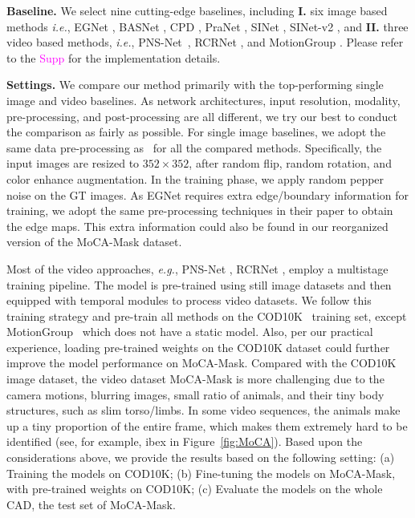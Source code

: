 \documentclass[10pt,twocolumn,letterpaper]{article}
\def\eg{\emph{e.g.}}
\def\ie{\emph{i.e.}}
\newcommand{\supp}[1]{\textcolor{magenta}{#1}}
\def\figref#1{Figure~\ref{#1}}
\begin{document}
\textbf{Baseline.}
We select nine cutting-edge baselines, including \textbf{I.} six image based methods \ie, EGNet \cite{zhao2019EGNet}, BASNet \cite{Qin_2019_CVPR} ,   {CPD} \cite{Wu_2019_CVPR}, {PraNet} \cite{fan2020pra}, {SINet} \cite{fan2020Camouflage}, {SINet-v2} \cite{fan2021concealed}, and \textbf{II.}  three video based methods, \ie, PNS-Net~\cite{ji2021progressively}, {RCRNet} \cite{yan2019semi}, and {MotionGroup} \cite{yang2021selfsupervised}. Please refer to the \supp{Supp} for the implementation details.

\textbf{Settings.}
We compare our method primarily with the top-performing single image and video baselines. As network architectures, input resolution, modality, pre-processing, and post-processing are all different, we try our best to conduct the comparison as fairly as possible. For single image baselines, we adopt the same data pre-processing as~\cite{fan2020Camouflage, fan2021concealed} for all the compared methods. Specifically, the input images are resized to $352 \times 352$, after random flip, random rotation, and color enhance augmentation. In the training phase, we apply random pepper noise on the GT images.
As EGNet \cite{zhao2019EGNet} requires extra edge/boundary information for training, we adopt the same pre-processing techniques in their paper to obtain the edge maps. This extra information could also be found in our reorganized version of the MoCA-Mask dataset. 


Most of the video approaches, \eg, PNS-Net \cite{ji2021progressively}, RCRNet \cite{yan2019semi}, employ a multistage training pipeline. The model is pre-trained using still image datasets and then equipped with temporal modules to process video datasets. We follow this training strategy and pre-train all methods on the COD10K~\cite{fan2021concealed} training set, except MotionGroup~\cite{yang2021selfsupervised} which does not have a static model. Also, per our practical experience, loading pre-trained weights on the COD10K dataset could further improve the model performance on MoCA-Mask. Compared with the COD10K image dataset, the video dataset MoCA-Mask is more challenging due to the camera motions, blurring images, small ratio of animals, and their tiny body structures, such as slim torso/limbs. In some video sequences, the animals make up a tiny proportion of the entire frame, which makes them extremely hard to be identified (see, for example, ibex in \figref{fig:MoCA}). Based upon the considerations above, we provide the results based on the following setting: (a) Training the models on COD10K; (b) Fine-tuning the models on MoCA-Mask, with pre-trained weights on COD10K; (c) Evaluate the models on the whole CAD, the test set of MoCA-Mask.
\end{document}
